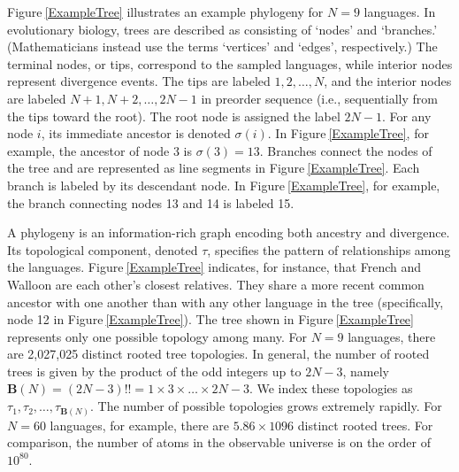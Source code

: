 \documentclass[numsec,webpdf,modern,large,namedate]{oup-authoring-template}
\begin{document}
Figure$~$\ref{ExampleTree} illustrates an example phylogeny for $\textit{N}= 9$ languages. In evolutionary biology, trees are described as consisting of ‘nodes’ and ‘branches.’ (Mathematicians instead use the terms ‘vertices’ and ‘edges’, respectively.) The terminal nodes, or tips, correspond to the sampled languages, while interior nodes represent divergence events. The tips are labeled $1, 2, \ldots , \textit{N}$, and the interior nodes are labeled $\textit{N}+ 1, \textit{N}+ 2, \ldots , 2\textit{N}- 1$ in preorder sequence (i.e., sequentially from the tips toward the root). The root node is assigned the label $2\textit{N}- 1$. For any node $i$, its immediate ancestor is denoted $\sigma (i)$. In Figure$~$\ref{ExampleTree}, for example, the ancestor of node 3 is $\sigma (3)= 13$. Branches connect the nodes of the tree and are represented as line segments in Figure$~$\ref{ExampleTree}. Each branch is labeled by its descendant node. In Figure$~$\ref{ExampleTree}, for example, the branch connecting nodes 13 and 14 is labeled 15. 

A phylogeny is an information-rich graph encoding both ancestry and divergence. Its topological component, denoted $\tau $, specifies the pattern of relationships among the languages. Figure$~$\ref{ExampleTree} indicates, for instance, that French and Walloon are each other's closest relatives. They share a more recent common ancestor with one another than with any other language in the tree (specifically, node 12 in Figure$~$\ref{ExampleTree}). The tree shown in Figure$~$\ref{ExampleTree} represents only one possible topology among many. For $\textit{N}= 9$ languages, there are 2,027,025 distinct rooted tree topologies. In general, the number of rooted trees is given by the product of the odd integers up to $2\textit{N}- 3$, namely $\mathbf{B}(\textit{N})= (2\textit{N}- 3)!!$$=$$1\times 3\times \ldots \times 2\textit{N}- 3$. We index these topologies as $\tau _1, \tau _2, \ldots , \tau _{\mathbf{B}(\textit{N})}$. The number of possible topologies grows extremely rapidly. For $\textit{N}= 60$ languages, for example, there are $5.86\times 1096$ distinct rooted trees. For comparison, the number of atoms in the observable universe is on the order of $10^{80}$. 
\end{document}

